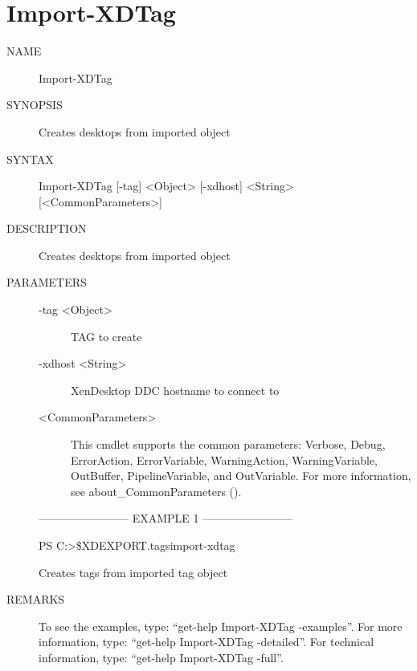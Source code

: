 \documentclass[letterpaper,10pt,english]{sphinxmanual}
\begin{document}
\section{Import-XDTag}
\label{\detokenize{cmd_import:import-xdtag}}\begin{description}
\item[{NAME}] \leavevmode
Import-XDTag

\item[{SYNOPSIS}] \leavevmode
Creates desktops from imported object

\item[{SYNTAX}] \leavevmode
Import-XDTag {[}-tag{]} \textless{}Object\textgreater{} {[}-xdhost{]} \textless{}String\textgreater{} {[}\textless{}CommonParameters\textgreater{}{]}

\item[{DESCRIPTION}] \leavevmode
Creates desktops from imported object

\item[{PARAMETERS}] \leavevmode\begin{description}
\item[{-tag \textless{}Object\textgreater{}}] \leavevmode
TAG to create

\item[{-xdhost \textless{}String\textgreater{}}] \leavevmode
XenDesktop DDC hostname to connect to

\item[{\textless{}CommonParameters\textgreater{}}] \leavevmode
This cmdlet supports the common parameters: Verbose, Debug,
ErrorAction, ErrorVariable, WarningAction, WarningVariable,
OutBuffer, PipelineVariable, and OutVariable. For more information, see
about\_CommonParameters ().

\end{description}

————————\textendash{} EXAMPLE 1 ————————\textendash{}

PS C:\textgreater{}\$XDEXPORT.tags\textbar{}import-xdtag

Creates tags from imported tag object

\item[{REMARKS}] \leavevmode
To see the examples, type: “get-help Import-XDTag -examples”.
For more information, type: “get-help Import-XDTag -detailed”.
For technical information, type: “get-help Import-XDTag -full”.

\end{description}
\end{document}
